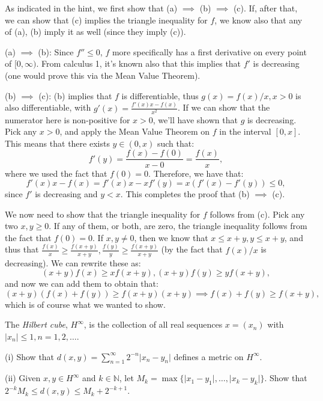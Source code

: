 \begin{solution}
    
    As indicated in the hint, we first show that (a) $\implies$ (b) $\implies$ (c).
    If, after that, we can show that (c) implies the triangle inequality for $f$, we know also that any of (a), (b) imply it as well (since they imply (c)).

    (a) $\implies$ (b): Since $f'' \leq 0$, $f$ more specifically has a first derivative on every point of $[0, \infty)$.
    From calculus 1, it's known also that this implies that $f'$ is decreasing (one would prove this via the Mean Value Theorem).

    (b) $\implies$ (c): (b) implies that $f$ is differentiable, thus $g(x) = f(x)/x, x > 0$ is also differentiable, with $g'(x) = \frac{f'(x)x - f(x)}{x^2}$.
    If we can show that the numerator here is non-positive for $x > 0$, we'll have shown that $g$ is decreasing.
    Pick any $x > 0$, and apply the Mean Value Theorem on $f$ in the interval $[0, x]$.
    This means that there exists $y \in (0, x)$ such that:
    $$f'(y) = \frac{f(x) - f(0)}{x - 0} = \frac{f(x)}{x},$$
    where we used the fact that $f(0) = 0$.
    Therefore, we have that:
    $$f'(x)x - f(x) = f'(x)x - xf'(y) = x(f'(x) - f'(y)) \leq 0,$$
    since $f'$ is decreasing and $y < x$.
    This completes the proof that (b) $\implies$ (c).

    We now need to show that the triangle inequality for $f$ follows from (c).
    Pick any two $x, y \geq 0$.
    If any of them, or both, are zero, the triangle inequality follows from the fact that $f(0) = 0$.
    If $x, y \neq 0$, then we know that $x \leq x + y, y \leq x + y$, and thus that $\frac{f(x)}{x} \geq \frac{f(x + y)}{x + y}, \frac{f(y)}{y} \geq \frac{f(x + y)}{x + y}$ (by the fact that $f(x)/x$ is decreasing). 
    We can rewrite these as:
    $$(x + y)f(x) \geq xf(x+ y), (x+ y)f(y) \geq yf(x + y),$$
    and now we can add them to obtain that:
    $$(x + y)(f(x) + f(y)) \geq f(x + y)(x + y) \implies f(x) + f(y) \geq f(x + y),$$
    which is of course what we wanted to show.
\end{solution}

\begin{exercise}{10}
    The \textit{Hilbert cube}, $H^{\infty}$, is the collection of all real sequences $x = (x_n)$ with $\lvert x_n \rvert \leq 1, n = 1, 2, \ldots$.

    (i) Show that $d(x, y) = \sum_{n=1}^{\infty} 2^{-n} \lvert x_n - y_n \rvert$ defines a metric on $H^{\infty}$.

    (ii) Given $x, y \in H^{\infty}$ and $k \in \mathbb{N}$, let $M_k = \max\{ \lvert x_1 - y_1 \rvert, \ldots, \lvert x_k - y_k \rvert\}$.
    Show that $2^{-k}M_k \leq d(x, y) \leq M_k + 2^{-k + 1}$.
\end{exercise}

